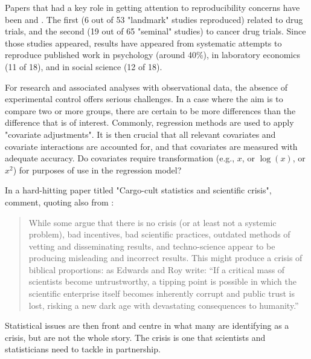 Papers that had a key role in getting attention to reproducibility
concerns have been \citet{prinz2011believe} and 
\citep{begley2012drug}.  The first (6 out of 53 "landmark" studies
reproduced)  related to drug trials, and the second (19 out of 65 
"seminal" studies) to cancer drug trials.  Since those studies
appeared, results have appeared from systematic attempts to
reproduce  published work in psychology (around 40\%), in
laboratory economics (11 of 18), and in social science (12 of 18).

For research and associated analyses with observational data,
the absence of experimental control offers serious challenges.
In a case where the aim is to compare two or more groups, there 
are certain to be more differences than the difference that is
of interest.  Commonly, regression methods are used to apply
"covariate adjustments".  It is then crucial that all relevant 
covariates and covariate interactions are accounted for, and that 
covariates are measured with adequate accuracy.  Do covariates
require transformation (e.g., $x$, or $\log(x)$, or $x^2$) for
purposes of use in the regression model?

In a hard-hitting paper titled "Cargo-cult statistics and
scientific crisis", \citet{stark_saltelli_2018} comment,
quoting also from \citet{edwards_roy_2017}:
\begin{quote}
While some argue that there is no crisis (or at least not a systemic problem), bad incentives, bad scientific practices, outdated methods of vetting and disseminating results, and techno-science appear to be producing misleading and incorrect results. This might produce a crisis 
of biblical proportions: as Edwards and Roy write: ``If a critical mass 
of scientists become untrustworthy, a tipping point is possible in 
which the scientific enterprise itself becomes inherently corrupt and public trust is lost, risking a new dark age with devastating 
consequences to humanity.''
\end{quote}
Statistical issues are then front and centre in what many are identifying
as a crisis, but are not the whole story. The crisis is one that
scientists and statisticians need to tackle in partnership.

